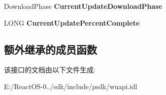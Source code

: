 \begin{DoxyCompactItemize}
\item 
\mbox{\label{interface_w_u_api_lib_1_1_i_download_progress_a3d422ba5368173c91295b4a2bf333b51}} 
Download\+Phase {\bfseries Current\+Update\+Download\+Phase}
\item 
\mbox{\label{interface_w_u_api_lib_1_1_i_download_progress_a778d4f04339bc26bb3a3b7ead90dfc57}} 
L\+O\+NG {\bfseries Current\+Update\+Percent\+Complete}
\end{DoxyCompactItemize}
\subsection*{额外继承的成员函数}


该接口的文档由以下文件生成\+:\begin{DoxyCompactItemize}
\item 
E\+:/\+React\+O\+S-\/0../sdk/include/psdk/wuapi.\+idl\end{DoxyCompactItemize}
